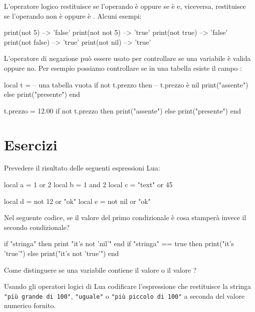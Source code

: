 L'operatore logico  restituisce  se l'operando è 
oppure se è  e, viceversa, restituisce  se l'operando non
è  oppure è . Alcuni esempi:
\begin{lines}
print(not 5)       --> 'false'
print(not not 5)   --> 'true'
print(not true)    --> 'false'
print(not false)   --> 'true'
print(not nil)     --> 'true'
\end{lines}

L'operatore di negazione può essere usato per controllare se una variabile è
valida oppure no. Per esempio possiamo controllare se in una tabella esiste il
campo :
\begin{lines}
local t = {} -- una tabella vuota
if not t.prezzo then -- t.prezzo è nil
    print("assente")
else
    print("presente")
end

t.prezzo = 12.00
if not t.prezzo then
    print("assente")
else
    print("presente")
end
\end{lines}


\section{Esercizi}

\begin{Exercise}[label=oplogic-01]
Prevedere il risultato delle seguenti espressioni Lua:
\begin{lines}
local a = 1 or 2
local b = 1 and 2
local c = "text" or 45

local d = not 12 or "ok"
local e = not nil or "ok"
\end{lines}
\end{Exercise}

\begin{Exercise}[label=oplogic-02]
Nel seguente codice, se il valore del primo condizionale è  cosa
stamperà invece il secondo condizionale?
\begin{lines}
if "stringa" then print "it's not 'nil'" end
if "stringa" == true then
    print("it's 'true'")
else
    print("it's not 'true'")
end
\end{lines}
\end{Exercise}

\begin{Exercise}[label=oplogic-03]
Come distinguere se una variabile contiene il valore  o il valore
?  
\end{Exercise}

\begin{Exercise}[label=oplogic-04]
Usando gli operatori logici di Lua codificare l'espressione che restituisce la
stringa \verb|"più grande di 100"|, \verb|"uguale"| o
\verb|"più piccolo di 100"| a seconda del valore numerico fornito.
\end{Exercise}


